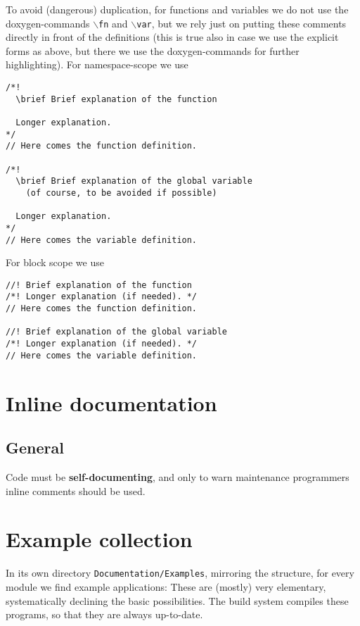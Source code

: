 \documentclass{book}
\begin{document}
To avoid (dangerous) duplication, for functions and variables we do not use the doxygen-commands \texttt{$\backslash$fn} and \texttt{$\backslash$var}, but we rely just on putting these comments directly in front of the definitions (this is true also in case we use the explicit forms as above, but there we use the doxygen-commands for further highlighting). For namespace-scope we use
\begin{verbatim}
/*!
  \brief Brief explanation of the function
  
  Longer explanation.
*/
// Here comes the function definition.

/*!
  \brief Brief explanation of the global variable
    (of course, to be avoided if possible)

  Longer explanation.
*/
// Here comes the variable definition.
\end{verbatim}
For block scope we use
\begin{verbatim}
//! Brief explanation of the function
/*! Longer explanation (if needed). */
// Here comes the function definition.

//! Brief explanation of the global variable
/*! Longer explanation (if needed). */
// Here comes the variable definition.
\end{verbatim}












\chapter{Inline documentation}
\label{cha:InlineDoc}

\section{General}
\label{sec:InlineDocGeneral}

Code must be \textbf{self-documenting}, and only to warn maintenance programmers inline comments should be used.


\chapter{Example collection}
\label{cha:DocumentationExamples}

In its own directory \texttt{Documentation/Examples}, mirroring the \OKlibrary{} structure, for every module we find example applications: These are (mostly) very elementary, systematically declining the basic possibilities. The build system compiles these programs, so that they are always up-to-date.
\end{document}
